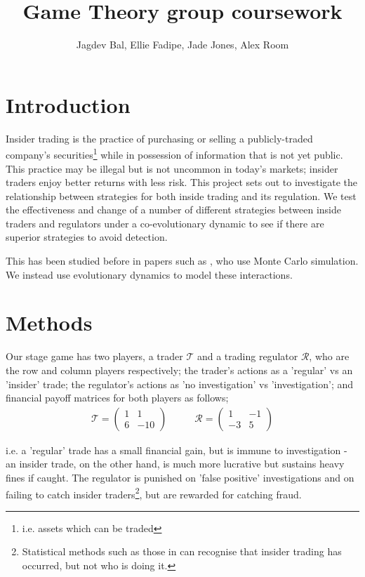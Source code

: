 \documentclass{article}
\title{Game Theory group coursework}
\author{Jagdev Bal, Ellie Fadipe, Jade Jones, Alex Room}
\date{}
\begin{document}
\maketitle

\section{Introduction}
Insider trading is the practice of purchasing or selling a publicly-traded company’s securities\footnote{i.e. assets which can be traded} while in possession of information that is not yet public. This practice may be illegal but is not uncommon in today's markets; insider traders enjoy better returns with less risk. This project sets out to investigate the relationship between strategies for both inside trading and its regulation. We test the effectiveness and change of a number of different strategies between inside traders and regulators under a co-evolutionary dynamic to see if there are superior strategies to avoid detection. 

This has been studied before in papers such as \citet{smales2017game}, who use Monte Carlo simulation. We instead use evolutionary dynamics to model these interactions.

\section{Methods}
Our stage game has two players, a trader $\mathcal{T}$ and a trading regulator $\mathcal{R}$, who are the row and column players respectively; the trader's actions as a 'regular' vs an 'insider' trade; the regulator's actions as 'no investigation' vs 'investigation'; and financial payoff matrices for both players as follows;
\begin{equation*}
\begin{split}
    \mathcal{T} = 
    \begin{pmatrix}
    1 & 1 \\
    6 & -10
    \end{pmatrix}
\end{split}
\quad\quad
\begin{split}
    \mathcal{R} = 
    \begin{pmatrix}
    1 & -1 \\
    -3 & 5
    \end{pmatrix}
\end{split}
\end{equation*}

i.e. a 'regular' trade has a small financial gain, but is immune to investigation - an insider trade, on the other hand, is much more lucrative but sustains heavy fines if caught. The regulator is punished on 'false positive' investigations and on failing to catch insider traders\footnote[2]{Statistical methods such as those in \citet{bris2005insider} can recognise that insider trading has occurred, but not who is doing it.}, but are rewarded for catching fraud. 
\end{document}
